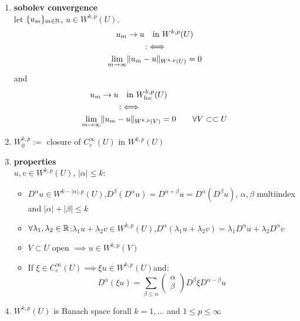\begin{enumerate}[label=(\alph*)]
	\item \textbf{sobolev convergence}\\
	let $\{u_m\}_{m\in \mathbb{N}}$, $u \in W^{k,p}(U)$. 
	\begin{align*}
		& \quad u_m \to u \quad \text{in } W^{k,p}(U)\\
		& \hspace{1.5cm}:\iff \\
		&\underset{m \to \infty}{\lim} \|u_m -u\|_{W^{k,p}(U)} = 0
	\end{align*}
	and
	\begin{align*}
	& \quad u_m \to u \quad \text{in } W^{k,p}_{\text{loc}}(U)\\
	& \hspace{1.5cm}:\iff \\
	&\underset{m \to \infty}{\lim} \|u_m -u\|_{W^{k,p}(V)} = 0 \qquad \forall V \subset\subset U
	\end{align*}
	
	\item $W^{k,p}_0:=$ closure of $C^\infty_c(U)$ in $W^{k,p}(U)$
	\item \textbf{properties}\\
	$u,v \in W^{k,p}(U)$, $|\alpha| \leq k$:
	\begin{itemize}
		\item $D^{\alpha} u \in W^{k-|\alpha|,p}(U)$,\quad $D^{\beta}(D^{\alpha}u) = D^{\alpha+\beta}u =  D^{\alpha}(D^{\beta}u) $, $\alpha, \beta$ multiindex and $|\alpha| + |\beta| \leq k$
		\item $\forall \lambda_1, \lambda_2 \in \mathbb{R}$:\quad $\lambda_1 u +\lambda_2 v \in W^{k,p}(U)$,\quad $D^{\alpha}(\lambda_1 u +\lambda_2 v) = \lambda_1 D^{\alpha}u + \lambda_2 D^{\alpha}v$
		\item $V \subset U$ open $\implies u \in W^{k,p}(V)$
		\item If $\xi \in C^\infty_c(U) \implies \xi u \in W^{k,p}(U)$\quad  and:
		\begin{equation*}
			D^{\alpha}(\xi u) = \displaystyle \sum_{\beta \leq \alpha}
			\begin{pmatrix}
			\alpha\\
			\beta
			\end{pmatrix} 
			D^{\beta}\xi D^{\alpha -\beta} u
		\end{equation*}
	\end{itemize}
	
	\item $W^{k,p}(U)$ is Banach space forall $k=1,\dots$ and $1\leq p \leq \infty$
	
	
\end{enumerate}

